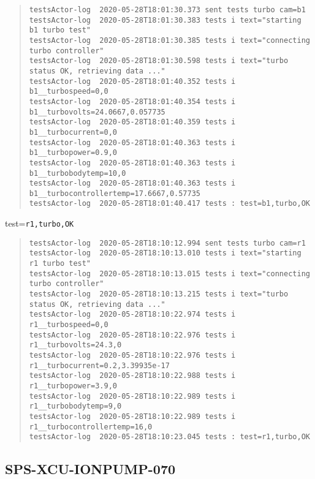 \begin{quote}
\begin{tiny}
\begin{verbatim}
testsActor-log  2020-05-28T18:01:30.373 sent tests turbo cam=b1
testsActor-log  2020-05-28T18:01:30.383 tests i text="starting b1 turbo test"
testsActor-log  2020-05-28T18:01:30.385 tests i text="connecting turbo controller"
testsActor-log  2020-05-28T18:01:30.598 tests i text="turbo status OK, retrieving data ..."
testsActor-log  2020-05-28T18:01:40.352 tests i b1__turbospeed=0,0
testsActor-log  2020-05-28T18:01:40.354 tests i b1__turbovolts=24.0667,0.057735
testsActor-log  2020-05-28T18:01:40.359 tests i b1__turbocurrent=0,0
testsActor-log  2020-05-28T18:01:40.363 tests i b1__turbopower=0.9,0
testsActor-log  2020-05-28T18:01:40.363 tests i b1__turbobodytemp=10,0
testsActor-log  2020-05-28T18:01:40.363 tests i b1__turbocontrollertemp=17.6667,0.57735
testsActor-log  2020-05-28T18:01:40.417 tests : test=b1,turbo,OK
\end{verbatim}
\end{tiny}
\end{quote}

\noindent test=\texttt{r1,turbo,OK}

\begin{quote}
\begin{tiny}
\begin{verbatim}
testsActor-log  2020-05-28T18:10:12.994 sent tests turbo cam=r1
testsActor-log  2020-05-28T18:10:13.010 tests i text="starting r1 turbo test"
testsActor-log  2020-05-28T18:10:13.015 tests i text="connecting turbo controller"
testsActor-log  2020-05-28T18:10:13.215 tests i text="turbo status OK, retrieving data ..."
testsActor-log  2020-05-28T18:10:22.974 tests i r1__turbospeed=0,0
testsActor-log  2020-05-28T18:10:22.976 tests i r1__turbovolts=24.3,0
testsActor-log  2020-05-28T18:10:22.976 tests i r1__turbocurrent=0.2,3.39935e-17
testsActor-log  2020-05-28T18:10:22.988 tests i r1__turbopower=3.9,0
testsActor-log  2020-05-28T18:10:22.989 tests i r1__turbobodytemp=9,0
testsActor-log  2020-05-28T18:10:22.989 tests i r1__turbocontrollertemp=16,0
testsActor-log  2020-05-28T18:10:23.045 tests : test=r1,turbo,OK
\end{verbatim}
\end{tiny}
\end{quote}

\subsection{SPS-XCU-IONPUMP-070}
\label{sec:tc-070}

